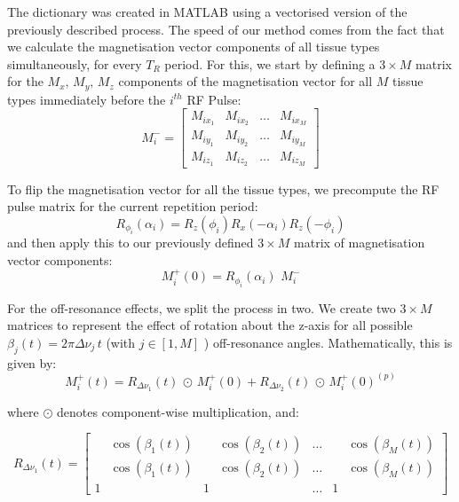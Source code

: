 The dictionary was created in MATLAB using a vectorised version of the previously described process.
The speed of our method comes from the fact that we calculate the magnetisation vector components of all tissue types simultaneously, for every $T_R$ period.
For this, we start by defining a $3 \times M$ matrix for the $M_x, \, M_y, \, M_z$ components of the magnetisation vector for all $M$ tissue types immediately before the $i^{th}$ RF Pulse:
\begin{equation}
    M^{-}_i = 
    \begin{bmatrix}
        M_{ix_1} & M_{ix_2} & \dots & M_{ix_M} \\
        M_{iy_1} & M_{iy_2} & \dots & M_{iy_M} \\
        M_{iz_1} & M_{iz_2} & \dots & M_{iz_M}
    \end{bmatrix}
\end{equation}

To flip the magnetisation vector for all the tissue types, we precompute the RF pulse matrix for the current repetition period:
\begin{equation}
        R_{\phi_i}(\alpha_i) = R_{z}(\phi_i) R_{x}(-\alpha_i) R_{z}(-\phi_i)
\end{equation}
and then apply this to our previously defined $3 \times M$ matrix of magnetisation vector components:
\begin{equation}
    M^{+}_i(0) = R_{\phi_i}(\alpha_i) \, \, M^{-}_i
\end{equation}

For the off-resonance effects, we split the process in two.
We create two $3 \times M$ matrices to represent the effect of rotation about the z-axis for all possible $\beta_j(t) = 2\pi \Delta \nu_j \, t$ \big(with $j \in [1, M]$ \big) off-resonance angles.
Mathematically, this is given by:
\begin{equation}
    M^{+}_i (t) = R_{\Delta \nu_1}(t) \, \odot \, M^{+}_i(0) + R_{\Delta \nu_2}(t)  \, \odot \, M^{+}_i(0)^{(p)}
\end{equation}

where $\odot$ denotes component-wise multiplication, and:

\begin{equation}
    R_{\Delta \nu_1}(t)  = \begin{bmatrix} \phantom{-}\cos(\beta_{1}(t) ) & \phantom{-}\cos(\beta_{2}(t) ) & \dots & \phantom{-}\cos(\beta_{M}(t) ) \\
    \phantom{-}\cos(\beta_{1}(t) ) & \phantom{-}\cos(\beta_{2}(t) ) & \dots & \phantom{-}\cos(\beta_{M}(t) ) \\
    1    &        1   & \dots &  1
    \end{bmatrix}
\end{equation}

